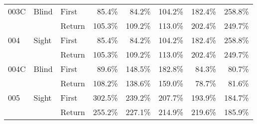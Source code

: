 \begin{table}[!htb]
\begin{tabular}{lllrrrrr}
003C & Blind & First &   85.4\% &   84.2\% &                                               104.2\% &                                                182.4\% &   258.8\% \\
    &       & Return &  105.3\% &  109.2\% &                                               113.0\% &                                                202.4\% &   249.7\% \\
004 & Sight & First &   85.4\% &   84.2\% &                                               104.2\% &                                                182.4\% &   258.8\% \\
    &       & Return &  105.3\% &  109.2\% &                                               113.0\% &                                                202.4\% &   249.7\% \\
004C & Blind & First &   89.6\% &  148.5\% &                                               182.8\% &                                                 84.3\% &    80.7\% \\
    &       & Return &  108.2\% &  138.6\% &                                               159.0\% &                                                 78.7\% &    81.6\% \\
005 & Sight & First &  302.5\% &  239.2\% &                                               207.7\% &                                                193.9\% &   184.7\% \\
    &       & Return &  255.2\% &  227.1\% &                                               214.9\% &                                                219.6\% &   185.9\% \\
\bottomrule
\end{tabular}
\end{table}

